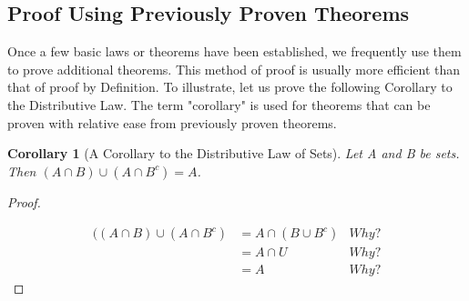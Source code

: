 \documentclass[10pt,]{book}
\theoremstyle{plain}
\newtheorem{corollary}[theorem]{Corollary}
\theoremstyle{definition}
\theoremstyle{definition}
\theoremstyle{definition}
\begin{document}
\subsection[Proof Using Previously Proven Theorems]{Proof Using Previously Proven Theorems}\label{ss-proof-with-theorems}
Once a few basic laws or theorems have been established, we frequently use them to prove additional theorems. This method of proof is usually more efficient than that of proof by Definition. To illustrate, let us prove the following Corollary to the Distributive Law.   The term "corollary" is used for theorems that can be proven with relative ease from previously proven theorems.
%
\begin{corollary}[A Corollary to the Distributive Law of Sets]\label{th-corrollary-to-distr}
Let A and B be sets. Then \((A\cap  B) \cup  (A\cap  B^c) = A\).%
\end{corollary}
\begin{proof}\hypertarget{proof-3}{}
\begin{equation*}
\begin{split}
((A\cap  B) \cup  (A\cap  B^c) & = A \cap (B \cup B^c) & Why?\\
& = A \cap U & Why?\\
& = A &Why? 
\end{split}
\end{equation*}%
\end{proof}
\typeout{************************************************}
\typeout{************************************************}
\end{document}

